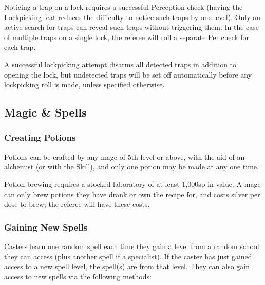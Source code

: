 \documentclass{article}
\begin{document}
\begin{multicols}{2}
Noticing a trap on a lock requires a successful Perception check (having
the Lockpicking feat reduces the difficulty to notice such traps by one
level). Only an active search for traps can reveal such traps without
triggering them. In the case of multiple traps on a single lock, the
referee will roll a separate Per check for each trap.

A successful lockpicking attempt disarms all detected traps in addition
to opening the lock, but undetected traps will be set off automatically
before any lockpicking roll is made, unless specified otherwise.

\subsection{Magic \& Spells}\label{magic-spells}

\subsubsection{Creating Potions}\label{creating-potions}

Potions can be crafted by any mage of 5th level or above, with the aid
of an alchemist (or with the Skill), and only one potion may be made at
any one time.

Potion brewing requires a stocked laboratory of at least 1,000sp in
value. A mage can only brew potions they have drank or own the recipe
for, and costs silver per dose to brew; the referee will have these
costs.

\subsubsection{Gaining New Spells}\label{gaining-new-spells}

Casters learn one random spell each time they gain a level from a random
school they can access (plus another spell if a specialist). If the
caster has just gained access to a new spell level, the spell(s) are
from that level. They can also gain access to new spells via the
following methods:


\end{multicols}
\end{document}

